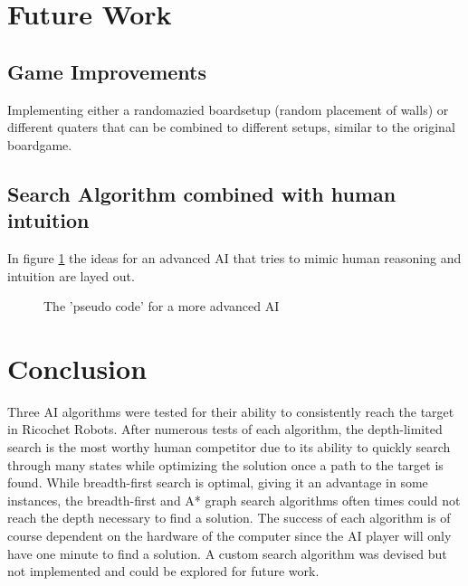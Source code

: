 \documentclass[a4paper,10pt]{article}
\begin{document}
\section{Future Work}
\label{sec:futureWork}

  \subsection{Game Improvements}
  Implementing either a randomazied boardsetup (random placement of walls) or different quaters that can be combined to different setups, similar to the original boardgame.

  \subsection{Search Algorithm combined with human intuition}
  In figure \ref{fig:pseudo} the ideas for an advanced AI that tries to mimic human reasoning and intuition are layed out. 
  \begin{figure}[!htb]
  \caption{The 'pseudo code' for a more advanced AI}
  \label{fig:pseudo}
  \end{figure}

\section{Conclusion}
Three AI algorithms were tested for their ability to consistently reach the target in Ricochet Robots. After numerous tests of each algorithm, the depth-limited search is
the most worthy human competitor due to its ability to quickly search through many states while optimizing the solution once a path to the target is found. While breadth-first
search is optimal, giving it an advantage in some instances, the breadth-first and A* graph search algorithms often times could not reach the depth necessary to find a solution.
The success of each algorithm is of course dependent on the hardware of the computer since the AI player will only have one minute to find a solution. A custom search
algorithm was devised but not implemented and could be explored for future work.
\end{document}
